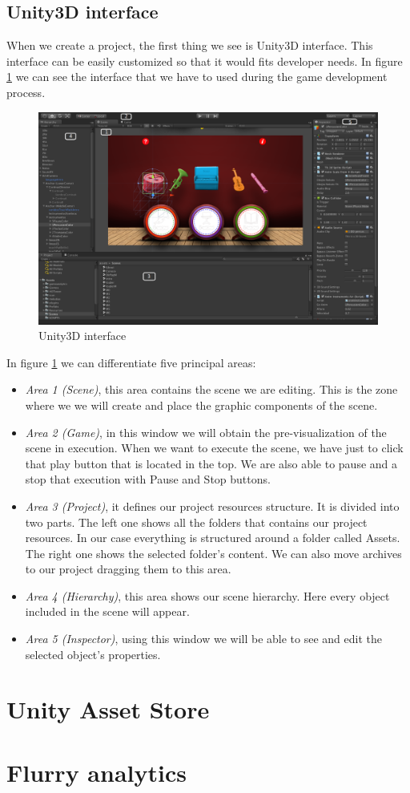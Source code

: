 \subsection{Unity3D interface}
\label{subsec:unityinterface}
When we create a project, the first thing we see is Unity3D interface. This interface can be easily customized so that it would fits developer needs. In figure \ref{fig:unity_interface_general} we can see the interface that we have to used during the game development process.

\begin{figure}[h]
\centering
\includegraphics[width=450pt]{graphics/enabling-tech/unity_interface_general.png}
\caption{Unity3D interface}
\label{fig:unity_interface_general}
\end{figure}

In figure \ref{fig:unity_interface_general} we can differentiate five principal areas:

\begin{itemize}
\item \textit{Area 1 (Scene)}, this area contains the scene we are editing. This is the zone where we we will create and place the graphic components of the scene.
\item \textit{Area 2 (Game)}, in this window we will obtain the pre-visualization of the scene in execution. When we want to execute the scene, we have just to click that play button that is located in the top. We are also able to pause and a stop that execution with Pause and Stop buttons.
\item \textit{Area 3 (Project)}, it defines our project resources structure. It is divided into two parts. The left one shows all the folders that contains our project resources. In our case everything is structured around a folder called Assets. The right one shows the selected folder's content. We can also move archives to our project dragging them to this area.
\item \textit{Area 4 (Hierarchy)}, this area shows our scene hierarchy. Here every object included in the scene will appear.
\item \textit{Area 5 (Inspector)}, using this window we will be able to see and edit the selected object's properties.
\end{itemize}

\section{Unity Asset Store}
\label{sec:assetstore}


\section{Flurry analytics}
\label{sec:flurry}
